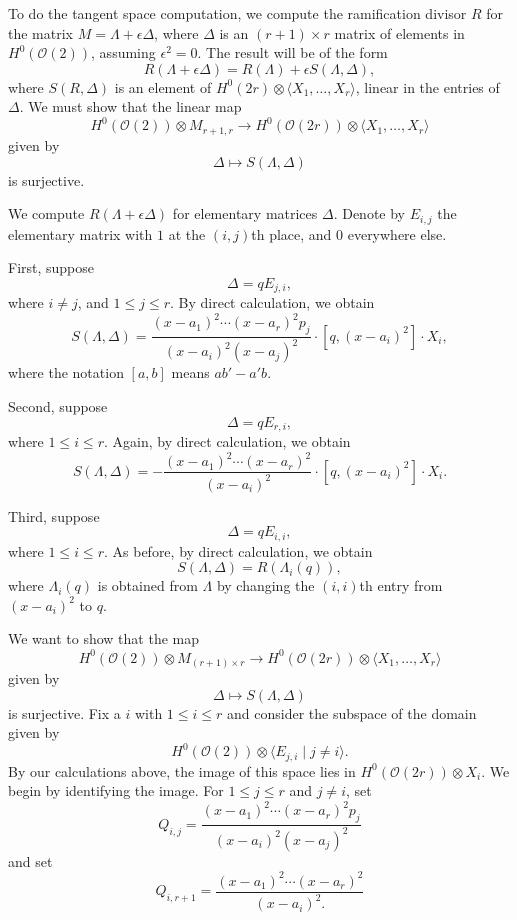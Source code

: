 \documentclass[11pt,reqno]{amsart}
\theoremstyle{plain}
\theoremstyle{definition}
\theoremstyle{remark}
\numberwithin{equation}{section}
\renewcommand{\to}{{\longrightarrow}}
\numberwithin{equation}{section}
\renewcommand{\O}{\mathcal O}
\begin{document}
To do the tangent space computation, we compute the ramification divisor $R$ for the matrix $M  = \Lambda + \epsilon \Delta$, where $\Delta$ is an $(r+1) \times r$ matrix of elements in $H^0(\O(2))$, assuming $\epsilon^2 = 0$.
The result will be of the form
\[ R(\Lambda + \epsilon \Delta) = R(\Lambda) + \epsilon S(\Lambda, \Delta),\]
where $S(R, \Delta)$ is an element of $H^0(2r) \otimes \langle  X_1, \dots, X_r \rangle$, linear in the entries of $\Delta$.
We must show that the linear map
\[ H^0(\O(2)) \otimes M_{r+1, r} \to H^0(\O(2r)) \otimes \langle  X_1, \dots, X_r \rangle\]
given by
\[ \Delta \mapsto S(\Lambda, \Delta)\]
is surjective.

We compute $R(\Lambda + \epsilon\Delta)$ for elementary matrices $\Delta$.
Denote by $E_{i,j}$ the elementary matrix with $1$ at the $(i,j)$th place, and $0$ everywhere else.

First, suppose
\[ \Delta = q E_{j,i},\]
where $i \neq j$, and $1 \leq j \leq r$.
By direct calculation, we obtain
\begin{equation}\label{eq:off_diagonal}
  S(\Lambda, \Delta) = \frac{(x-a_1)^2\cdots(x-a_r)^2 p_j}{(x-a_i)^2(x-a_j)^2} \cdot \left[q, (x-a_i)^2\right] \cdot X_i,
\end{equation}
where the notation $[a, b]$ means $ab' - a'b$.

Second, suppose
\[ \Delta = q E_{r,i},\]
where $1 \leq i \leq r$.
Again, by direct calculation, we obtain
\begin{equation}\label{eq:bottom}
  S(\Lambda, \Delta) = - \frac{(x-a_1)^2 \cdots (x-a_r)^2}{(x-a_i)^2} \cdot \left [q, (x-a_i)^2\right] \cdot X_i.
\end{equation}

Third, suppose
\[ \Delta = qE_{i,i},\]
where $1 \leq i \leq r$.
As before, by direct calculation, we obtain
\begin{equation}\label{eq:diagonal}
  S(\Lambda, \Delta) = R(\Lambda_i(q)),
\end{equation}
where $\Lambda_i(q)$ is obtained from $\Lambda$ by changing the $(i,i)$th entry from $(x-a_i)^2$ to $q$.

We want to show that the map
\begin{equation}\label{eqn:mainmap}
  H^0(\O(2)) \otimes M_{(r+1) \times r} \to H^0(\O(2r)) \otimes \langle  X_1, \dots, X_r \rangle
\end{equation}
given by
\[ \Delta \mapsto S(\Lambda, \Delta)\]
is surjective.
Fix a $i$ with $1 \leq i \leq r$ and consider the subspace of the domain given by
\[ H^0(\O(2)) \otimes \langle  E_{j,i}  \mid j \neq i \rangle.\]
By our calculations above, the image of this space lies in $H^0(\O(2r)) \otimes X_i$.
We begin by identifying the image.
For $1 \leq j \leq r$ and $j \neq i$, set
\[ Q_{i,j} = \frac{(x-a_1)^2\cdots (x-a_r)^2p_j}{(x-a_i)^2(x-a_j)^2}\]
and set
\[ Q_{i, r+1} = \frac{(x-a_1)^2 \cdots (x-a_r)^2}{(x-a_i)^2.}\]
\end{document}
